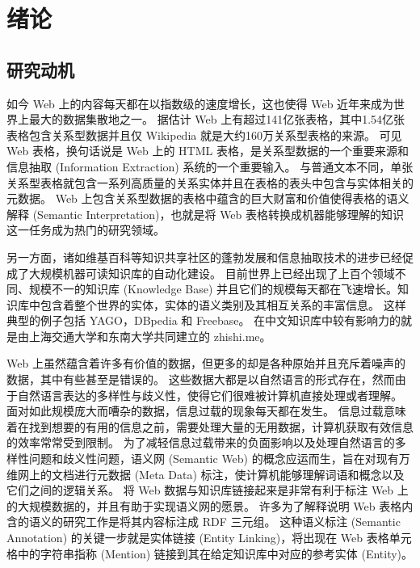 \chapter{绪论}

\section{研究动机}
如今 Web 上的内容每天都在以指数级的速度增长\cite{limaye2010annotating}，这也使得 Web 近年来成为世界上最大的数据集散地之一。
据估计 Web 上有超过141亿张表格，其中1.54亿张表格包含关系型数据并且仅 Wikipedia 就是大约160万关系型表格的来源。
可见Web 表格，换句话说是 Web 上的 HTML 表格，是关系型数据的一个重要来源和信息抽取 (Information Extraction) 系统的一个重要输入。
与普通文本不同，单张关系型表格就包含一系列高质量的关系实体并且在表格的表头中包含与实体相关的元数据。
Web 上包含关系型数据的表格中蕴含的巨大财富和价值使得表格的语义解释 (Semantic Interpretation)，也就是将 Web 表格转换成机器能够理解的知识这一任务成为热门的研究领域。\par

另一方面，诸如维基百科等知识共享社区的蓬勃发展和信息抽取技术的进步已经促成了大规模机器可读知识库的自动化建设。
目前世界上已经出现了上百个领域不同、规模不一的知识库 (Knowledge Base) 并且它们的规模每天都在飞速增长。知识库中包含着整个世界的实体，实体的语义类别及其相互关系的丰富信息。
这样典型的例子包括 YAGO\cite{suchanek2007yago}，DBpedia\cite{auer2007dbpedia} 和 Freebase\cite{bollacker2008freebase}。
在中文知识库中较有影响力的就是由上海交通大学和东南大学共同建立的 zhishi.me\cite{niu2011zhishi}。\par

Web 上虽然蕴含着许多有价值的数据，但更多的却是各种原始并且充斥着噪声的数据，其中有些甚至是错误的。
这些数据大都是以自然语言的形式存在，然而由于自然语言表达的多样性与歧义性，使得它们很难被计算机直接处理或者理解。
面对如此规模庞大而嘈杂的数据，信息过载的现象每天都在发生。
信息过载意味着在找到想要的有用的信息之前，需要处理大量的无用数据，计算机获取有效信息的效率常常受到限制。
为了减轻信息过载带来的负面影响以及处理自然语言的多样性问题和歧义性问题，语义网 (Semantic Web) 的概念应运而生，旨在对现有万维网上的文档进行元数据 (Meta Data) 标注，使计算机能够理解词语和概念以及它们之间的逻辑关系。
将 Web 数据与知识库链接起来是非常有利于标注 Web 上的大规模数据的，并且有助于实现语义网的愿景\cite{berners2001semantic}。
许多为了解释说明 Web 表格内含的语义的研究工作\cite{limaye2010annotating}\cite{hignette2009fuzzy}\cite{mulwad2013semantic}\cite{munoz2014using}\cite{syed2010exploiting}\cite{venetis2011recovering}是将其内容标注成 RDF 三元组。
这种语义标注 (Semantic Annotation) 的关键一步就是实体链接 (Entity Linking)，将出现在 Web 表格单元格中的字符串指称 (Mention) 链接到其在给定知识库中对应的参考实体 (Entity)。\par

